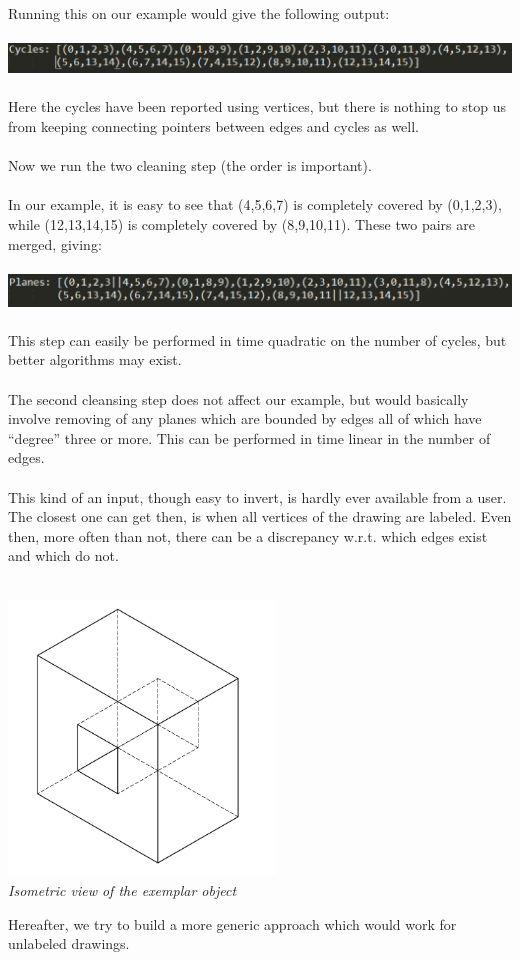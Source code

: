 \documentclass[
11pt, %
english, %
singlespacing, %
headsepline, %
]{MastersDoctoralThesis} %
\begin{document}
Running this on our example would give the following output:\\ \\
\includegraphics[width=\textwidth]{2d-3d-8} \\ \\
Here the cycles have been reported using vertices, but there is nothing to stop us from keeping connecting pointers between edges and cycles as well. \\ \\
Now we run the two cleaning step (the order is important).\\ \\
In our example, it is easy to see that (4,5,6,7) is completely covered by (0,1,2,3), while (12,13,14,15) is completely covered by (8,9,10,11).  These two pairs are merged, giving: \\ \\
\includegraphics[width=\textwidth]{2d-3d-9} \\ \\

This step can easily be performed in time quadratic on the number of cycles, but better algorithms may exist.\\ \\
The second cleansing step does not affect our example, but would basically involve removing of any planes which are bounded by edges all of which have “degree” three or more. This can be performed in time linear in the number of edges.\\ \\
This kind of an input, though easy to invert, is hardly ever available from a user. The closest one can get then, is when all vertices of the drawing are labeled. Even then, more often than not, there can be a discrepancy w.r.t. which edges exist and which do not.\\ \\

\begin{center}
\includegraphics[width = 200pt]{iso} \\
\emph{Isometric view of the exemplar object}
\end{center}
Hereafter, we try to build a more generic approach which would work for unlabeled drawings.
\end{document}
